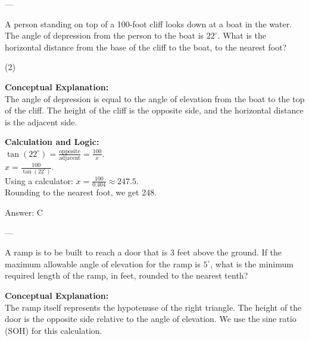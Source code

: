 \documentclass[11pt,paper=a4,answers]{exam}
\begin{document}
\begin{questions}
---

\question
A person standing on top of a 100-foot cliff looks down at a boat in the water. The angle of depression from the person to the boat is $22^\circ$. What is the horizontal distance from the base of the cliff to the boat, to the nearest foot?
\begin{center}
\end{center}
\begin{tasks}(2)
\end{tasks}

\begin{solution}
\textbf{Conceptual Explanation:} \\
The angle of depression is equal to the angle of elevation from the boat to the top of the cliff. The height of the cliff is the opposite side, and the horizontal distance is the adjacent side.

\vspace{10pt}
\textbf{Calculation and Logic:} \\
$\tan(22^\circ) = \frac{\text{opposite}}{\text{adjacent}} = \frac{100}{x}$. \\
$x = \frac{100}{\tan(22^\circ)}$. \\
Using a calculator: $x = \frac{100}{0.404} \approx 247.5$. \\
Rounding to the nearest foot, we get 248.

\vspace{15pt}
Answer: \colorbox{yellow!100}{C}
\end{solution}

---

\question
A ramp is to be built to reach a door that is 3 feet above the ground. If the maximum allowable angle of elevation for the ramp is $5^\circ$, what is the minimum required length of the ramp, in feet, rounded to the nearest tenth?

\begin{solution}
\textbf{Conceptual Explanation:} \\
The ramp itself represents the hypotenuse of the right triangle. The height of the door is the opposite side relative to the angle of elevation. We use the sine ratio (SOH) for this calculation.


\end{solution}
\end{questions}
\end{document}
